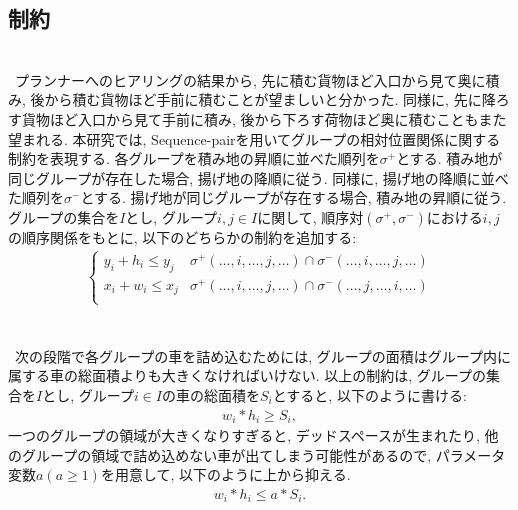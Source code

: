 \subsection{制約}
\\
\ プランナーへのヒアリングの結果から, 先に積む貨物ほど入口から見て奥に積み, 後から積む貨物ほど手前に積むことが望ましいと分かった. 
同様に, 先に降ろす貨物ほど入口から見て手前に積み, 後から下ろす荷物ほど奥に積むこともまた望まれる. 
本研究では, Sequence-pairを用いてグループの相対位置関係に関する制約を表現する. 
各グループを積み地の昇順に並べた順列を$\sigma^+$とする. 
積み地が同じグループが存在した場合, 揚げ地の降順に従う. 
同様に, 揚げ地の降順に並べた順列を$\sigma^-$とする.
揚げ地が同じグループが存在する場合, 積み地の昇順に従う. \\
グループの集合を$I$とし, グループ$i,j \in I$に関して, 順序対$(\sigma^+,\sigma^-)$における$i,j$の順序関係をもとに, 以下のどちらかの制約を追加する: \\
\begin{eqnarray}
    \left\{
        \begin{array}{ll}
            y_i + h_i \leq y_j & \sigma^+(\ldots,i,\ldots,j,\ldots) \cap \sigma^-(\ldots,i,\ldots,j,\ldots) \\
            x_i + w_i \leq x_j & \sigma^+(\ldots,i,\ldots,j,\ldots) \cap \sigma^-(\ldots,j,\ldots,i,\ldots) \\
        \end{array}
    \right.
\end{eqnarray}\\


\\
\ 次の段階で各グループの車を詰め込むためには, グループの面積はグループ内に属する車の総面積よりも大きくなければいけない. 
以上の制約は, グループの集合を$I$とし, グループ$i \in I$の車の総面積を$S_i$とすると, 以下のように書ける: \\
\begin{eqnarray}
    w_i*h_i \geq S_i , 
\end{eqnarray}
一つのグループの領域が大きくなりすぎると, デッドスペースが生まれたり, 他のグループの領域で詰め込めない車が出てしまう可能性があるので, パラメータ変数$a (a \geq 1)$を用意して, 以下のように上から抑える. 
\begin{eqnarray}
    w_i*h_i \leq a*S_i.
    \label{a_const}
\end{eqnarray}\\

